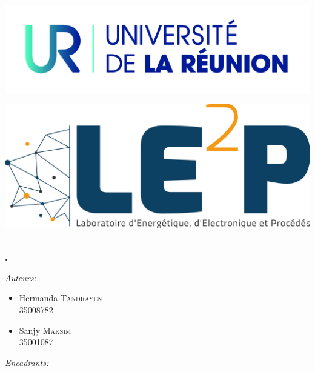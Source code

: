 \documentclass[14pt,oneside]{article}
\begin{document}
\begin{titlepage}
\phantom{aaaaaaaaaaaaaaaaaaaaaaaaaaaaaaaaaaaaaaa
ytrfdytfugvghikuhjbiujbhaaaaaaaaaaaaaaa}


\begin{minipage}[c]{.46\linewidth}
		\centering
		\includegraphics[scale=0.1]{logo} 
	\end{minipage}
\hfill%
\begin{minipage}[c]{.46\linewidth}
		\centering
		\includegraphics[scale=0.04]{LE2P} 
\end{minipage}



\phantom{aaaaaaaaaaaaaaaaaaaaaaaaaaaaaaaaaaaaaaa
ytrfdytfugvghikuhjbiujbhaaaaaaaaaaaaaaa}
\center
\fbox{\begin{minipage}[t][1cm][c]{8cm}
\begin{center}
{\huge \bfseries \textcolor{Rapport}{Feuille de Route}}
\end{center}
\end{minipage}}\\[0.5cm]
\textbf{\Large \color{Mulberry} .}\\[0.5cm] 
\begin{minipage}{0.5\textwidth}
\begin{flushleft} \large
\hspace{0.22\textwidth}\emph{\underline{Auteurs}:}\\
\begin{multicols}{2}
\begin{itemize}[font=\color{airforceblue} \Large, label=, leftmargin=0cm]
\item{Hermanda \textsc{Tandrayen} \\ {\small{35008782}}}
\item{Sanjy \textsc{Maksim} \\ {\small{35001087}}}
\end{itemize}
\end{multicols}
\end{flushleft}
\end{minipage}
\begin{minipage}{0.45\textwidth}
\begin{flushright} \large
\emph{\underline{Encadrants}:}\phantom{aaaaa}\\


\end{flushright}
\end{minipage}
\end{titlepage}
\end{document}
